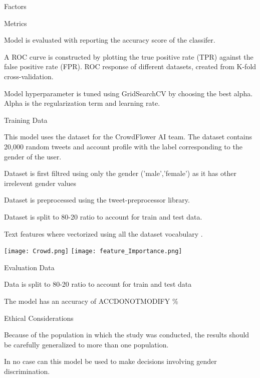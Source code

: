 \documentclass{article}
\begin{document}
\begin{adjustwidth}{-60pt}{-30pt}
\begin{singlespace}
\begin{tcolorbox}[title=\textbf{Model Card - Tweeter Gender Classification },
     breakable, sharp corners, boxrule=0.7pt]
{\begin{multicols}{2}
\begin{mcsection}{Factors}
 \end{mcsection}
 
 \begin{mcsection}{Metrics}
     \item Model is evaluated with reporting the accuracy score of the classifer.
     
     \item A ROC curve is constructed by plotting the true positive rate (TPR) against the false positive rate (FPR). ROC response of different datasets, created from K-fold cross-validation.
     
     \item Model hyperparameter is tuned using GridSearchCV by choosing the best alpha. Alpha is the regularization term and learning rate.
     
 \end{mcsection}
 
 \begin{mcsection}{Training Data}
     \item This model uses the dataset for the CrowdFlower AI team.  The dataset contains 20,000 random tweets and account profile with the label corresponding to the gender of the user.
     \item Dataset is first filtred using only the gender ('male','female') as it has other irrelevent gender values
     \item Dataset is preprocessed using the tweet-preprocessor library. 
     \item Dataset is split to 80-20 ratio to account for train and test data.
     \item Text features where vectorized using all the dataset vocabulary .

 \end{mcsection}
     \texttt{[image: Crowd.png]}
    \texttt{[image: feature\_Importance.png]}
 
 \begin{mcsection}{Evaluation Data}
   
     \item Data is split to 80-20 ratio to account for train and test data
     \item The model has an accuracy of ACCDONOTMODIFY \%
  

 \end{mcsection}
 
 
 
 
 \begin{mcsection}{Ethical Considerations}
     \item Because of the population in which the study was conducted, the results should be carefully generalized to more than one population.
     \item In no case can this model be used to make decisions involving gender discrimination.
 \end{mcsection}
 

\end{multicols}}
\end{tcolorbox}
\end{singlespace}
\end{adjustwidth}
\end{document}

